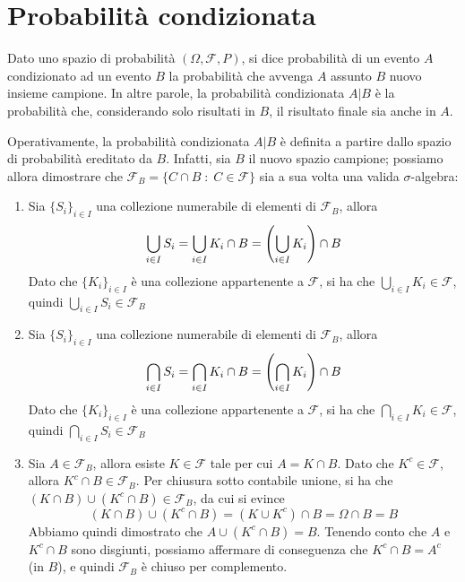 \documentclass{article}
\begin{document}
    

    \newpage
    \section{Probabilità condizionata}
        Dato uno spazio di probabilità $(\Omega, \mathcal{F}, P)$, si dice probabilità di un evento $A$ condizionato ad un evento $B$ la probabilità che avvenga $A$ assunto $B$ nuovo insieme campione.
        In altre parole, la probabilità condizionata $A | B$ è la probabilità che, considerando solo risultati in $B$, il risultato finale sia anche in $A$.

        \vspace{10pt}
        Operativamente, la probabilità condizionata $A | B$ è definita a partire dallo spazio di probabilità ereditato da $B$. 
        Infatti, sia $B$ il nuovo spazio campione; possiamo allora dimostrare che $\mathcal{F}_{B} = \{ C \cap B \; : \; C \in \mathcal{F}\}$ sia a sua volta una valida $\sigma$-algebra:
        \begin{enumerate}
            \item Sia $\{S_{i}\}_{i \in I}$ una collezione numerabile di elementi di $\mathcal{F}_{B}$, allora 
            \[
                \bigcup_{i \in I} S_{i} = \bigcup_{i \in I} K_{i} \cap B = \qty(\bigcup_{i \in I} K_{i}) \cap B 
            \]
            Dato che $\{K_{i}\}_{i \in I}$ è una collezione appartenente a $\mathcal{F}$, si ha che $\displaystyle \bigcup_{i \in I} K_{i} \in \mathcal{F}$, quindi $\displaystyle \bigcup_{i \in I} S_{i} \in \mathcal{F}_{B}$

            \item Sia $\{S_{i}\}_{i \in I}$ una collezione numerabile di elementi di $\mathcal{F}_{B}$, allora
            \[
                \bigcap_{i \in I} S_{i} = \bigcap_{i \in I} K_{i} \cap B = \qty(\bigcap_{i \in I} K_{i}) \cap B 
            \]
            Dato che $\{K_{i}\}_{i \in I}$ è una collezione appartenente a $\mathcal{F}$, si ha che $\displaystyle \bigcap_{i \in I} K_{i} \in \mathcal{F}$, quindi $\displaystyle \bigcap_{i \in I} S_{i} \in \mathcal{F}_{B}$

            \item Sia $A \in \mathcal{F}_{B}$, allora esiste $K \in \mathcal{F}$ tale per cui $A = K \cap B$. 
            Dato che $K^{c} \in \mathcal{F}$, allora $K^{c} \cap B \in \mathcal{F}_{B}$. 
            Per chiusura sotto contabile unione, si ha che $(K \cap B) \cup (K^{c} \cap B) \in \mathcal{F}_{B}$, da cui si evince
            \[
                (K \cap B) \cup (K^{c} \cap B) = (K \cup K^{c}) \cap B = \Omega \cap B = B
            \]
            Abbiamo quindi dimostrato che $A \cup (K^{c} \cap B) = B$. Tenendo conto che $A$ e $K^{c} \cap B$ sono disgiunti, possiamo affermare di conseguenza che $K^{c} \cap B = A^{c}$ (in $B$), e quindi $\mathcal{F}_{B}$ è chiuso per complemento.
        \end{enumerate}
\end{document}
